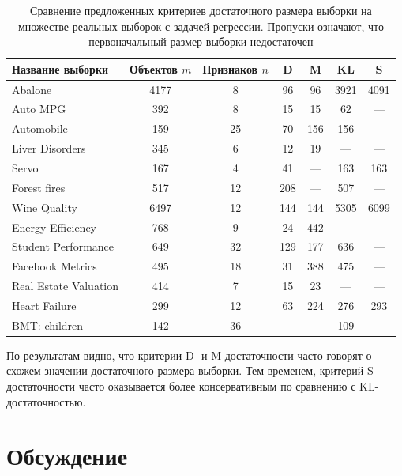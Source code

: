 \begin{table}[htbp]
    \centering
    \caption{Сравнение предложенных критериев достаточного размера выборки на множестве реальных выборок с задачей регрессии. Пропуски означают, что первоначальный размер выборки недостаточен}
    \label{tab:linear-comparison}
    \begin{SingleSpace}
        \begin{tabular}{@{}lcccccc@{}} 
            \toprule
            Название выборки & Объектов $m$ & Признаков $n$ & D & M & KL & S \\
            \midrule
            Abalone & 4177 & 8 & 96 & 96 & 3921 & 4091 \\
            Auto MPG & 392 & 8 & 15 & 15 & 62 & --- \\
            Automobile & 159 & 25 & 70 & 156 & 156 & --- \\
            Liver Disorders & 345 & 6 & 12 & 19 & --- & --- \\
            Servo & 167 & 4 & 41 & --- & 163 & 163 \\
            Forest fires & 517 & 12 & 208 & --- & 507 & --- \\
            Wine Quality & 6497 & 12 & 144 & 144 & 5305 & 6099 \\
            Energy Efficiency & 768 & 9 & 24 & 442 & --- & --- \\
            Student Performance & 649 & 32 & 129 & 177 & 636 & --- \\
            Facebook Metrics & 495 & 18 & 31 & 388 & 475 & ---  \\
            Real Estate Valuation & 414 & 7 & 15 & 23 & --- & --- \\
            Heart Failure & 299 & 12 & 63 & 224 & 276 & 293 \\
            BMT: children & 142 & 36 & --- & --- & 109 & --- \\
            \bottomrule
        \end{tabular}
    \end{SingleSpace}
\end{table}

По результатам видно, что критерии D- и M-достаточности часто говорят о схожем значении достаточного размера выборки. Тем временем, критерий S-достаточности часто оказывается более консервативным по сравнению с KL-достаточностью.

\clearpage
\section{Обсуждение}

